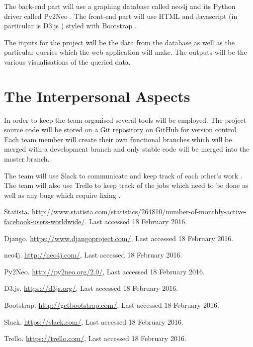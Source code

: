 \documentclass[10pt,onecolumn]{article}
\begin{document}
The back-end part will use a graphing database called neo4j \cite{neo4j} and its Python driver called Py2Neo \cite{py2neo}. The front-end part will use HTML and Javascript (in particular is D3.js \cite{d3js}) styled with Bootstrap \cite{bootstrap}.

The inputs for the project will be the data from the database as well as the particular queries which the web application will make. The outputs will be the various visualisations of the queried data.

\section{The Interpersonal Aspects}
In order to keep the team organised several tools will be employed. The project source code will be stored on a Git repository on GitHub for version control. Each team member will create their own functional branches which will be merged with a development branch and only stable code will be merged into the master branch.

 The team will use Slack to communicate and keep track of each other's work \cite{slack}. The team will also use Trello to keep track of the jobs which need to be done as well as any bugs which require fixing \cite{trello}.


\begin{thebibliography}{1}
 Statista. \url {http://www.statista.com/statistics/264810/number-of-monthly-active-facebook-users-worldwide/}. Last accessed 18 February 2016. 

  Django. \url{https://www.djangoproject.com/}, Last accessed 18 February 2016.

 neo4j. \url{http://neo4j.com/}, Last accessed 18 February 2016.

 Py2Neo. \url{http://py2neo.org/2.0/}, Last accessed 18 February 2016.

 D3.js. \url{https://d3js.org/}, Last accessed 18 February 2016.


 Bootstrap. \url{http://getbootstrap.com/}, Last accessed 18 February 2016.

 Slack. \url{https://slack.com/}, Last accessed 18 February 2016.

 Trello. \url{https://trello.com/}, Last accessed 18 February 2016.
	
\end{thebibliography}

\clearpage
\end{document}
